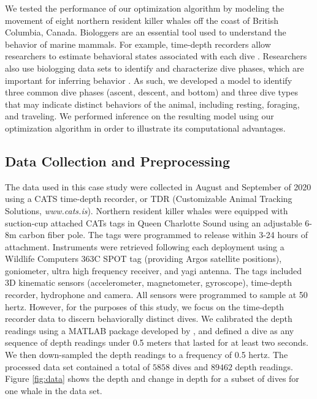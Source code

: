 
We tested the performance of our optimization algorithm by modeling the movement of eight northern resident killer whales off the coast of British Columbia, Canada. Biologgers are an essential tool used to understand the behavior of marine mammals. For example, time-depth recorders allow researchers to estimate behavioral states associated with each dive \citep[e.g. foraging, resting, and traveling,][]{Tennessen:2023,McRae:2024}. Researchers also use biologging data sets to identify and characterize dive phases, which are important for inferring behavior \citep[e.g., prey capture often occurs in the bottom phase of a foraging dive,][]{Wright:2017,Jensen:2023}. As such, we developed a model to identify three common dive phases (ascent, descent, and bottom) and three dive types that may indicate distinct behaviors of the animal, including resting, foraging, and traveling. We performed inference on the resulting model using our optimization algorithm in order to illustrate its computational advantages.

\subsection{Data Collection and Preprocessing}

The data used in this case study were collected in August and September of 2020 using a CATS time-depth recorder, or TDR (Customizable Animal Tracking Solutions, {\em{www.cats.is}}). Northern resident killer whales were equipped with suction-cup attached CATs tags in Queen Charlotte Sound using an adjustable 6-8m carbon fiber pole. The tags were programmed to release within 3-24 hours of attachment. Instruments were retrieved following each deployment using a Wildlife Computers 363C SPOT tag (providing Argos satellite positions), goniometer, ultra high frequency receiver, and yagi antenna. The tags included 3D kinematic sensors (accelerometer, magnetometer, gyroscope), time-depth recorder, hydrophone and camera. All sensors were programmed to sample at 50 hertz. However, for the purposes of this study, we focus on the time-depth recorder data to discern behaviorally distinct dives. We calibrated the depth readings using a MATLAB package developed by \citet{Cade:2021}, and defined a dive as any sequence of depth readings under 0.5 meters that lasted for at least two seconds. We then down-sampled the depth readings to a frequency of 0.5 hertz. The processed data set contained a total of $5858$ dives and $89462$ depth readings. Figure \ref{fig:data} shows the depth and change in depth for a subset of dives for one whale in the data set. 

